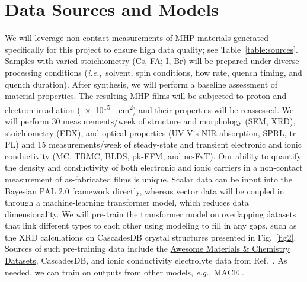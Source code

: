 \documentclass[pgs]{DOE}
\newcommand{\mnote}[1]{{\marginpar{\color{red} #1}}}
\newcommand{\todo}[2]{{[\color{RawSienna} #1] \color{red} #2}}
\renewcommand{\mnote}[1]{}
\renewcommand{\todo}[2]{}
\begin{document}
\section{Data Sources and Models}
\mnote{0.5 page}
%
% 
% 



We will leverage non-contact measurements of MHP materials generated specifically for this project to ensure high data quality; see Table~\ref{table:sources}. 
Samples with varied stoichiometry (Cs, FA; I, Br) will be prepared under diverse processing conditions (\textit{i.e.},\ solvent, spin conditions,  flow rate, quench timing, and quench duration). After synthesis, we will perform a baseline assessment of material properties.
The resulting MHP films will be subjected to proton and electron irradiation (\SI{e15}{\per\square\centi\meter}) and their properties will be reassessed. 
We will perform 30 measurements/week of structure and morphology (SEM, XRD), stoichiometry (EDX), and optical properties (UV-Vis-NIR absorption, SPRL, tr-PL) and 15 measurements/week of steady-state and transient electronic and ionic conductivity (MC, TRMC, BLDS, pk-EFM, and nc-FvT). Our ability to quantify the density and conductivity of both electronic and ionic carriers in a non-contact measurement of as-fabricated films is unique.
Scalar data can be input into the Bayesian PAL 2.0 framework directly, whereas vector data will be coupled in through a machine-learning transformer model, which reduces data dimensionality. 
We will pre-train the transformer model on overlapping datasets that link different types to each other using modeling to fill in any gaps, such as the XRD calculations on CascadesDB crystal structures presented in Fig.~\ref{fig2}. Sources of such pre-training data include the \href{https://github.com/blaiszik/awesome-matchem-datasets}{Awesome Materials \& Chemistry Datasets}, CascadesDB, and ionic conductivity electrolyte data from Ref.~.
As needed, we can train on outputs from other models, \textit{e.g.}, MACE \cite{wu2025versatile,wu2023molformer,wang2024graphformer,choudhary2024atomgpt}.
\end{document}
